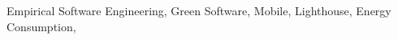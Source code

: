\documentclass[10pt, conference, compsocconf]{IEEEtran}
\begin{document}
\begin{IEEEkeywords}
Empirical Software Engineering, Green Software, Mobile, Lighthouse, Energy Consumption,
\end{IEEEkeywords}













\end{document}

